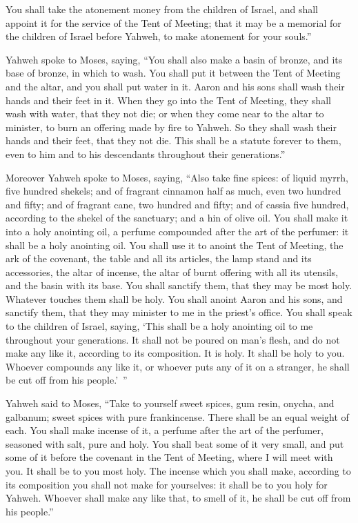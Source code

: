 {You shall take the atonement money from the children of Israel, and shall appoint it for the service of the Tent of Meeting; that it may be a memorial for the children of Israel before Yahweh, to make atonement for your souls.”
\par }{\PP {}Yahweh spoke to Moses, saying,
“You shall also make a basin of bronze, and its base of bronze, in which to wash. You shall put it between the Tent of Meeting and the altar, and you shall put water in it.
Aaron and his sons shall wash their hands and their feet in it.
When they go into the Tent of Meeting, they shall wash with water, that they not die; or when they come near to the altar to minister, to burn an offering made by fire to Yahweh.
So they shall wash their hands and their feet, that they not die. This shall be a statute forever to them, even to him and to his descendants throughout their generations.”
\par }{\PP {}Moreover Yahweh spoke to Moses, saying,
“Also take fine spices: of liquid myrrh, five hundred shekels; and of fragrant cinnamon half as much, even two hundred and fifty; and of fragrant cane, two hundred and fifty;
and of cassia five hundred, according to the shekel of the sanctuary; and a hin of olive oil.
You shall make it into a holy anointing oil, a perfume compounded after the art of the perfumer: it shall be a holy anointing oil.
You shall use it to anoint the Tent of Meeting, the ark of the covenant,
the table and all its articles, the lamp stand and its accessories, the altar of incense,
the altar of burnt offering with all its utensils, and the basin with its base.
You shall sanctify them, that they may be most holy. Whatever touches them shall be holy.
You shall anoint Aaron and his sons, and sanctify them, that they may minister to me in the priest’s office.
You shall speak to the children of Israel, saying, ‘This shall be a holy anointing oil to me throughout your generations.
It shall not be poured on man’s flesh, and do not make any like it, according to its composition. It is holy. It shall be holy to you.
Whoever compounds any like it, or whoever puts any of it on a stranger, he shall be cut off from his people.’ ”
\par }{\PP {}Yahweh said to Moses, “Take to yourself sweet spices, gum resin, onycha, and galbanum; sweet spices with pure frankincense. There shall be an equal weight of each.
You shall make incense of it, a perfume after the art of the perfumer, seasoned with salt, pure and holy.
You shall beat some of it very small, and put some of it before the covenant in the Tent of Meeting, where I will meet with you. It shall be to you most holy.
The incense which you shall make, according to its composition you shall not make for yourselves: it shall be to you holy for Yahweh.
Whoever shall make any like that, to smell of it, he shall be cut off from his people.”

}
